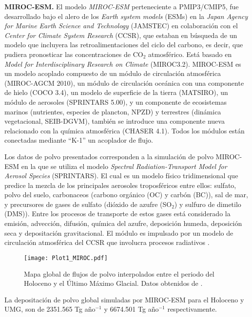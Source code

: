  {\bf MIROC-ESM.} El modelo \textit{MIROC-ESM} perteneciente a PMIP3/CMIP5, fue desarrollado bajo el alero de los \textit{Earth system models} (ESMs) en la \textit{Japan Agency for Marine Earth Science and Technology} (JAMSTEC) en colaboración con el \textit{Center for Climate System Research} (CCSR), que estaban en búsqueda de un modelo que incluyera las retroalimentaciones del ciclo del carbono, es decir, que pudiera pronosticar las concentraciones de CO$_2$ atmosférico. Está basado en \textit{Model for Interdisciplinary Research on Climate} (MIROC3.2). MIROC-ESM es un modelo acoplado compuesto de un módulo de circulación atmosférica (MIROC-AGCM 2010), un módulo de circulación oceánica con una componente de hielo (COCO 3.4), un modelo de superficie de la tierra (MATSIRO), un módulo de aerosoles (SPRINTARS 5.00), y un componente de ecosistemas marinos (nutrientes, especies de plancton, NPZD) y terrestres (dinámica vegetacional, SEIB-DGVM), también se introduce una componente nueva relacionado con la química atmosférica (CHASER 4.1). Todos los módulos están conectadas mediante ``K-1'' un acoplador de flujo. 

Los datos de polvo presentados corresponden a la simulación de polvo MIROC-ESM en la que se utiliza el modelo \textit{Spectral Radiation-Transport Model for Aerosol Species} (SPRINTARS). El cual es un modelo físico tridimensional que predice la mezcla de los principales aerosoles troposféricos entre ellos: sulfato, polvo del suelo, carbonaceos (carbono orgánico (OC) y carbón (BC)), sal de mar, y precursores de gases de sulfato (dióxido de azufre (SO$_2$) y sulfuro de dimetilo (DMS)). Entre los procesos de transporte de estos gases está considerado la emisión, advección, difusión, química del azufre, deposición humeda, deposición seca y depositación gravitacional. El módulo es impulsado por un modelo de circulación atmosférica del CCSR que involucra procesos radiativos \citep{takemura2000global,sueyoshi2013set}.  

 \begin{figure}[H]
\centering
  \texttt{[image: Plot1\_MIROC.pdf]}
  \caption[Flujos de polvo \cite{sueyoshi2013set}]{Mapa global de flujos de polvo interpolados entre el periodo del Holoceno y el \'Ultimo M\'aximo Glacial. Datos obtenidos de \cite{sueyoshi2013set}.}
  \label{fig:MIROC}
\end{figure}

La depositación de polvo global simuladas por MIROC-ESM para el Holoceno y UMG, son de 2351.565 Tg año$^{-1}$ y 6674.501 Tg año$^{-1}$ respectivamente. 

